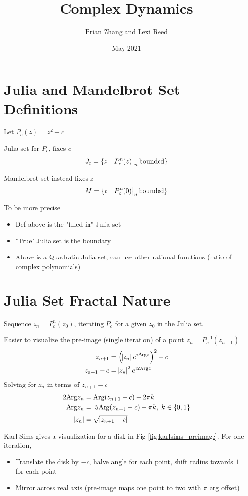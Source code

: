 \documentclass{article}
\title{Complex Dynamics}
\author{Brian Zhang and Lexi Reed}
\date{May 2021}
\begin{document}
\maketitle

\section{Julia and Mandelbrot Set Definitions}

Let $P_c(z) = z^2 + c$

Julia set for $P_c$, fixes $c$
\[ J_c = \{ z \mid  \abs{ P_c^n(z) }_n \textrm{bounded} \} \] 


Mandelbrot set instead fixes $z$
\[ M = \{ c \mid \abs{ P_c^n(0) }_n \textrm{bounded} \} \]

To be more precise
\begin{itemize}
    \item Def above is the "filled-in" Julia set
    \item "True" Julia set is the boundary
    \item Above is a Quadratic Julia set, can use other rational functions (ratio of complex polynomials)
\end{itemize}


\section{Julia Set Fractal Nature}

Sequence $z_n = P_c^n(z_0)$, iterating $P_c$ for a given $z_0$ in the Julia set.

Easier to visualize the pre-image (single iteration) of a point $z_n = P_c^{-1}(z_{n + 1})$
\begin{align*}
    z_{n + 1} &= \left( \abs{z_n}e^{i\text{Arg}{z}}\right)^2 + c \\
    z_{n + 1} - c &= \abs{z_n}^2e^{i2\text{Arg}{z}}
\end{align*}
Solving for $z_n$ in terms of $z_{n+1} - c$
\begin{align*}
    2\text{Arg}{z_n} &= \text{Arg}(z_{n+1} - c) + 2\pi k \\
    \text{Arg}{z_n} &= .5 \text{Arg}(z_{n+1} - c) + \pi k,\ k \in \{0, 1\} \\
    \abs{z_n} &= \sqrt{\abs{z_{n+1} - c}}
\end{align*}

Karl Sims gives a visualization for a disk in Fig \ref{fig:karlsims_preimage}. For one iteration,
\begin{itemize}
    \item Translate the disk by $-c$, halve angle for each point, shift radius towards $1$ for each point
    \item Mirror across real axis (pre-image maps one point to two with $\pi$ arg offset)
\end{itemize}
\end{document}
